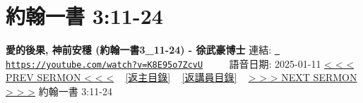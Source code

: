 \documentclass{book}
\begin{document}
\section{約翰一書 3:11-24}
\label{sec:K8E95o7ZcvU}
\textbf{愛的後果, 神前安穩 (約翰一書3\_11-24) - 徐武豪博士}
\newline
\newline
連結: \href{https://youtube.com/watch?v=K8E95o7ZcvU}{\texttt{ https://youtube.com/watch?v=K8E95o7ZcvU}} ~~~~ 語音日期: 2025-01-11 
\newline
\newline
\hyperref[sec:Y_0n0vkhyDU]{< < < PREV SERMON < < <}
~
\hyperlink{toc}{[返主目錄]}
~
\hyperref[ch:preacher1]{[返講員目錄]}
~
\hyperref[sec:cau3XNPSx68]{> > > NEXT SERMON > > >}
\newline
\newline
約翰一書 3:11-24
\newline
\end{document}
